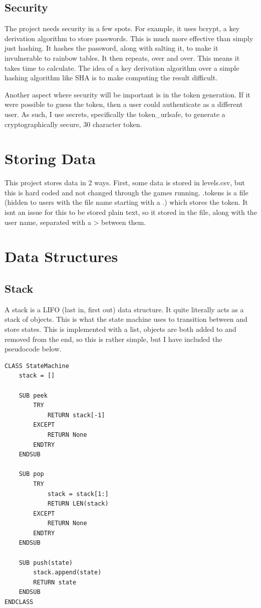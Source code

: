 \subsection{Security}
The project needs security in a few spots. For example, it uses bcrypt, a key derivation algorithm to store passwords. This is much more effective than simply just hashing. It hashes the password, along with salting it, to make it invulnerable to rainbow tables. It then repeats, over and over. This means it takes time to calculate. The idea of a key derivation algorithm over a simple hashing algorithm like SHA is to make computing the result difficult. 

Another aspect where security will be important is in the token generation. If it were possible to guess the token, then a user could authenticate as a different user. As such, I use secrets, specifically the token\_urlsafe, to generate a cryptographically secure, 30 character token. 

\section{Storing Data}
This project stores data in 2 ways. First, some data is stored in levels.csv, but this is hard coded and not changed through the games running. .tokens is a file (hidden to users with the file name starting with a .) which stores the token. It isnt an issue for this to be stored plain text, so it stored in the file, along with the user name, separated with a > between them.
\section{Data Structures}

\subsection{Stack}
A stack is a LIFO (last in, first out) data structure. It quite literally acts as a stack of objects. This is what the state machine uses to transition between and store states. This is implemented with a list, objects are both added to and removed from the end, so this is rather simple, but I have included the pseudocode below. 

\begin{lstlisting}
CLASS StateMachine
    stack = []
    
    SUB peek
        TRY
            RETURN stack[-1]
        EXCEPT
            RETURN None
        ENDTRY
    ENDSUB
    
    SUB pop
        TRY
            stack = stack[1:]
            RETURN LEN(stack)
        EXCEPT
            RETURN None
        ENDTRY
    ENDSUB
    
    SUB push(state)
        stack.append(state)
        RETURN state
    ENDSUB
ENDCLASS
\end{lstlisting}
